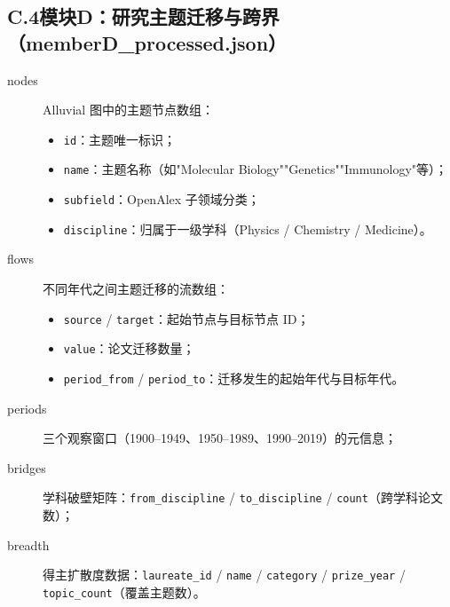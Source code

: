 \documentclass[UTF8]{CjC}
\theoremstyle{mystyle}
\begin{document}
{\subsection*{C.4\quad 模块D：研究主题迁移与跨界（memberD\_processed.json）}
\begin{description}
    \item[nodes] Alluvial 图中的主题节点数组：
    \begin{itemize}
        \item \texttt{id}：主题唯一标识；
        \item \texttt{name}：主题名称（如"Molecular Biology""Genetics""Immunology"等）；
        \item \texttt{subfield}：OpenAlex 子领域分类；
        \item \texttt{discipline}：归属于一级学科（Physics / Chemistry / Medicine）。
    \end{itemize}
    \item[flows] 不同年代之间主题迁移的流数组：
    \begin{itemize}
        \item \texttt{source} / \texttt{target}：起始节点与目标节点 ID；
        \item \texttt{value}：论文迁移数量；
        \item \texttt{period\_from} / \texttt{period\_to}：迁移发生的起始年代与目标年代。
    \end{itemize}
    \item[periods] 三个观察窗口（1900--1949、1950--1989、1990--2019）的元信息；
    \item[bridges] 学科破壁矩阵：\texttt{from\_discipline} / \texttt{to\_discipline} / \texttt{count}（跨学科论文数）；
    \item[breadth] 得主扩散度数据：\texttt{laureate\_id} / \texttt{name} / \texttt{category} / \texttt{prize\_year} / \texttt{topic\_count}（覆盖主题数）。
\end{description}

}
\end{document}
